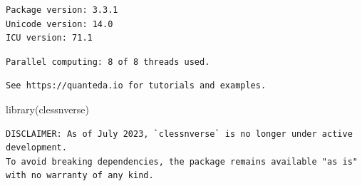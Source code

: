 \documentclass[
  letterpaper,
  DIV=11,
  numbers=noendperiod]{scrartcl}
\newenvironment{Shaded}{\begin{snugshade}}{\end{snugshade}}
\newcommand{\FunctionTok}[1]{\textcolor[rgb]{0.28,0.35,0.67}{#1}}
\newcommand{\NormalTok}[1]{\textcolor[rgb]{0.00,0.23,0.31}{#1}}
\begin{document}
\begin{verbatim}
Package version: 3.3.1
Unicode version: 14.0
ICU version: 71.1
\end{verbatim}

\begin{verbatim}
Parallel computing: 8 of 8 threads used.
\end{verbatim}

\begin{verbatim}
See https://quanteda.io for tutorials and examples.
\end{verbatim}

\begin{Shaded}
\begin{Highlighting}[]
\FunctionTok{library}\NormalTok{(clessnverse)}
\end{Highlighting}
\end{Shaded}

\begin{verbatim}
DISCLAIMER: As of July 2023, `clessnverse` is no longer under active development.
To avoid breaking dependencies, the package remains available "as is" with no warranty of any kind.
\end{verbatim}
\end{document}
